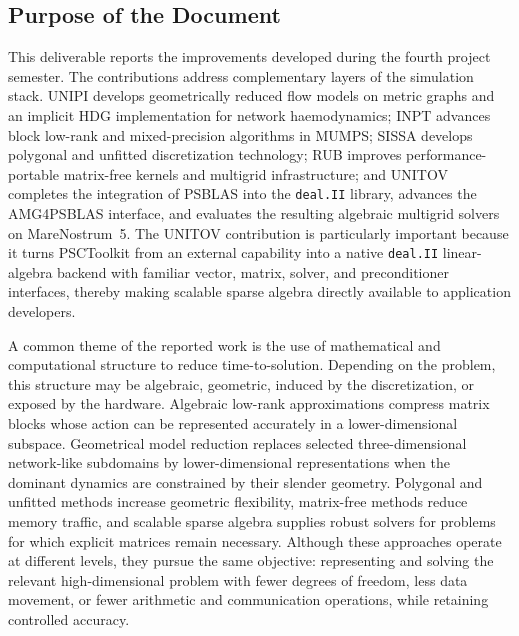 \documentclass[a4paper,12pt]{article}
\begin{document}
\subsection{{Purpose of the Document}}
This deliverable reports the improvements developed during the fourth project seme\-ster. The contributions address complementary layers of the simulation stack. UNIPI develops geometrically reduced flow models on metric graphs and an implicit HDG implementation for network haemodynamics; INPT advances block low-rank and mixed-precision algorithms in MUMPS; SISSA develops polygonal and unfitted discretization technology; RUB improves performance-portable matrix-free kernels and multigrid infrastructure; and UNITOV completes the integration of PSBLAS into the \texttt{deal.II} library, advances the AMG4PSBLAS interface, and evaluates the resulting algebraic multigrid solvers on MareNostrum~5. The UNITOV contribution is particularly important because it turns PSCToolkit from an external capability into a native \texttt{deal.II} linear-algebra backend with familiar vector, matrix, solver, and preconditioner interfaces, thereby making scalable sparse algebra directly available to application developers.

A common theme of the reported work is the use of mathematical and computational structure to reduce time-to-solution. Depending on the problem, this structure may be algebraic, geometric, induced by the discretization, or exposed by the hardware. Algebraic low-rank approximations compress matrix blocks whose action can be represented accurately in a lower-dimensional subspace. Geometrical model reduction replaces selected three-dimensional network-like subdomains by lower-dimensional representations when the dominant dynamics are constrained by their slender geometry. Polygonal and unfitted methods increase geometric flexibility, matrix-free methods reduce memory traffic, and scalable sparse algebra supplies robust solvers for problems for which explicit matrices remain necessary. Although these approaches operate at different levels, they pursue the same objective: representing and solving the relevant high-dimensional problem with fewer degrees of freedom, less data movement, or fewer arithmetic and communication operations, while retaining controlled accuracy.
\end{document}
